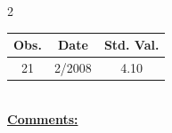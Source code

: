 
\bigskip 
\begin{multicols}{2}{ 
\begin{tabular}{ccc}
\hline  Obs.  &  Date &  Std. Val. \\ 
\hline 
                       21 &        2/2008 &          4.10 \vspace{-.12in} \\  
 \end{tabular} 
\\ 
 \columnbreak 
 \singlespacing 
 \underline{\textbf{Comments:}} \\ 
 \bigskip       

 } 
\end{multicols} 

